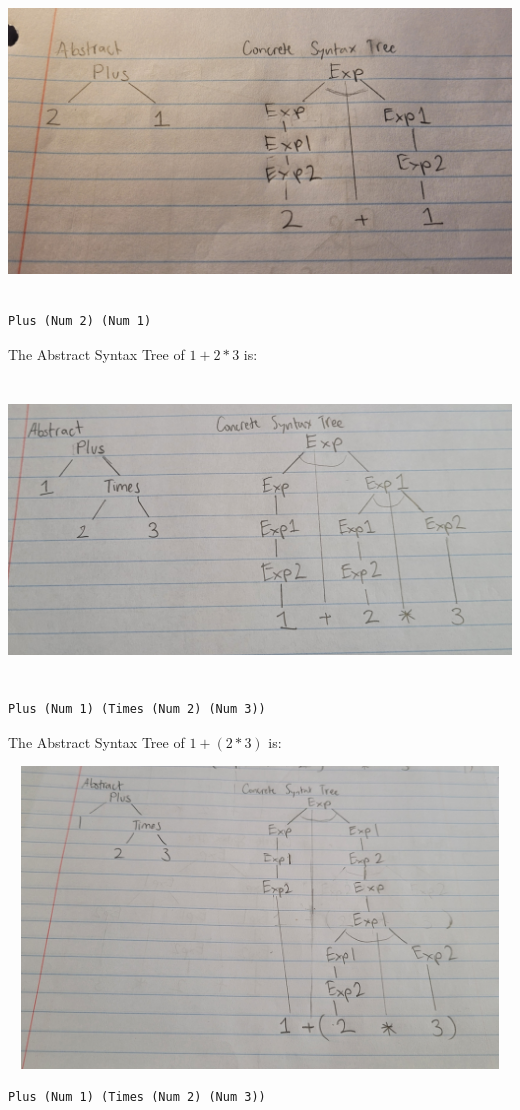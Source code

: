 \documentclass{article}
\theoremstyle{theorem}
\theoremstyle{definition}
\theoremstyle{remark}
\begin{document}
\includegraphics[width=15cm, height=8cm]{Report Images/week4_1.jpg}
\begin{lstlisting}
Plus (Num 2) (Num 1)
\end{lstlisting}


The Abstract Syntax Tree of $1 + 2 * 3$ is:

\includegraphics[width=15cm, height=8cm]{Report Images/week4_2.jpg}
\begin{lstlisting}
Plus (Num 1) (Times (Num 2) (Num 3))
\end{lstlisting}

The Abstract Syntax Tree of $1 + (2 * 3)$ is:

\includegraphics[width=15cm, height=8cm]{Report Images/week4_3.jpg}
\begin{lstlisting}
Plus (Num 1) (Times (Num 2) (Num 3))
\end{lstlisting}
\end{document}
